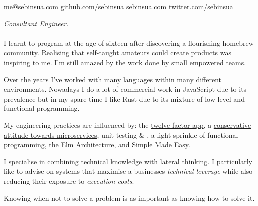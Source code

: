 \documentclass[10pt,a4paper]{article}
\begin{document}
\sloppy  %


\nobreakvspace{0.3em}  %

\noindent
me@sebinsua.com\sbull
\href{http://github.com/sebinsua}{github.com/sebinsua}\sbull
\href{http://sebinsua.com}{sebinsua.com}\sbull
\href{http://twitter.com/sebinsua}{twitter.com/sebinsua}

\spacedhrule{0.9em}{-0.4em}  %


\vspace{-1.3em}  %
\begin{multicols}{2}  %
\noindent \emph{Consultant Engineer.}
\\
\\
I learnt to program at the age of sixteen after discovering a flourishing homebrew community. Realising that self-taught amateurs could create products was inspiring to me. I'm still amazed by the work done by small empowered teams.\newline

Over the years I've worked with many languages within many different environments. Nowadays I do a lot of commercial work in JavaScript due to its prevalence but in my spare time I like Rust due to its mixture of low-level and functional programming.

My engineering practices are influenced by: the \href{http://12factor.net}{twelve-factor app}, a \href{https://www.tigerteam.dk/2014/micro-services-its-not-only-the-size-that-matters-its-also-how-you-use-them-part-2/}{conservative attitude towards microservices}, unit testing \& , a light sprinkle of functional programming, the \href{https://github.com/evancz/elm-architecture-tutorial/}{Elm Architecture}, and \href{http://infoq.com/presentations/Simple-Made-Easy}{Simple Made Easy}.

I specialise in combining technical knowledge with lateral thinking. I particularly like to advise on systems that maximise a businesses \emph{technical leverage} while also reducing their exposure to \emph{execution costs}.\newline

Knowing when not to solve a problem is as important as knowing how to solve it.

\end{multicols}
\end{document}
